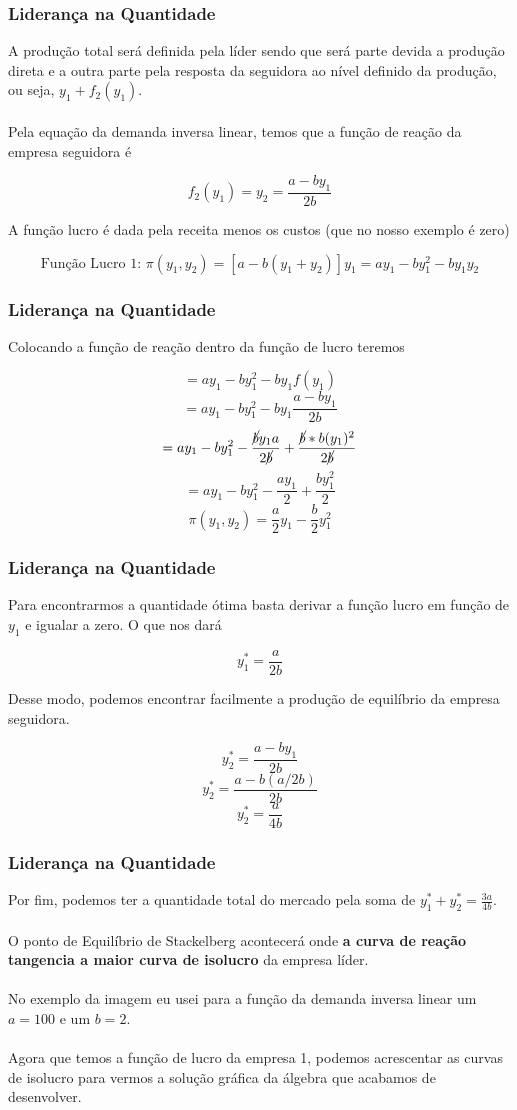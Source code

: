 \documentclass{beamer}[10]
\begin{document}
\begin{frame}
	\frametitle{Liderança na Quantidade}

	A produção total será definida pela líder sendo que será parte devida a produção direta e a outra parte pela resposta da seguidora ao nível definido da produção, ou seja, $y_1 + f_2(y_1)$.
	\\~\\
	Pela equação da demanda inversa linear, temos que a função de reação da empresa seguidora é

	$$ f_2(y_1) = y_2 = \frac{a - by_1}{2b}$$

	A função lucro é dada pela receita menos os custos (que no nosso exemplo é zero)

	$$ \textrm{Função Lucro 1: } \pi(y_1,y_2) = [a - b(y_1 + y_2)]y_1 = ay_1 -by_1^2 - by_1y_2 $$

\end{frame}

\begin{frame}
	\frametitle{Liderança na Quantidade}

	Colocando a função de reação dentro da função de lucro teremos

	$$ = ay_1 -by_1^2 - by_1f(y_1)$$
	$$ = ay_1 -by_1^2 - by_1\frac{a - by_1}{2b}$$
	$$ = ay_1 -by_1^2 - \frac{\cancel{b}y_1a}{2\cancel{b}} + \frac{\cancel{b}*b(y_1)^2}{2\cancel{b}}$$
	$$= ay_1 -by_1^2 - \frac{ay_1}{2} + \frac{by_1^2}{2}$$
	$$ \pi(y_1,y_2) = \frac{a}{2}y_1 - \frac{b}{2}y_1^2$$

\end{frame}

\begin{frame}
	\frametitle{Liderança na Quantidade}

	Para encontrarmos a quantidade ótima basta derivar a função lucro em função de $y_1$ e igualar a zero. O que nos dará 

	$$ y_1^* = \frac{a}{2b} $$

	Desse modo, podemos encontrar facilmente a produção de equilíbrio da empresa seguidora.

	$$ y_2^* = \frac{a - by_1}{2b} $$
	$$ y_2^* = \frac{a - b(a/2b)}{2b} $$
	$$ y_2^* = \frac{a}{4b} $$

\end{frame}

\begin{frame}
	\frametitle{Liderança na Quantidade}

	Por fim, podemos ter a quantidade total do mercado pela soma de $y_1^* + y_2^* = \frac{3a}{4b}$. 
	\\~\\
	O ponto de Equilíbrio de Stackelberg acontecerá onde \textbf{a curva de reação tangencia a maior curva de isolucro} da empresa líder. 
	\\~\\
	No exemplo da imagem eu usei para a função da demanda inversa linear um $a = 100$ e um $b = 2$.
	\\~\\
	Agora que temos a função de lucro da empresa 1, podemos acrescentar as curvas de isolucro para vermos a solução gráfica da álgebra que acabamos de desenvolver.

\end{frame}
\end{document}
